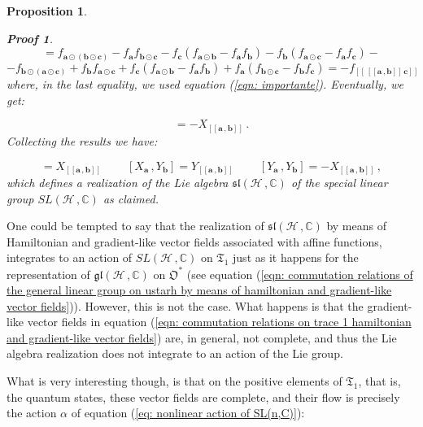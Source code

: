 \documentclass[11pt]{article}
\newcommand{\be}{\begin{equation}}
\newcommand{\ee}{\end{equation}}
\newcommand{\obsp}{\mathfrak{O}}
\newtheorem{prop}{Proposition}
\newtheorem*{pf}{Proof}
\begin{document}
\begin{prop}
\begin{pf}
$$
=f_{\mathbf{a}\odot(\mathbf{b}\odot\mathbf{c})} -  f_{\mathbf{a}}f_{\mathbf{b}\odot\mathbf{c}}  - 	 f_{\mathbf{c}} \left(f_{\mathbf{a}\odot\mathbf{b}}  -  f_{\mathbf{a}}f_{\mathbf{b}} \right) -  f_{\mathbf{b}} \left(f_{\mathbf{a}\odot\mathbf{c}}  -  f_{\mathbf{a}}f_{\mathbf{c}} \right) - 
$$
$$
-f_{\mathbf{b}\odot(\mathbf{a}\odot\mathbf{c})}  +  f_{\mathbf{b}}f_{\mathbf{a}\odot\mathbf{c}}  +  f_{\mathbf{c}} \left(f_{\mathbf{a}\odot\mathbf{b}}  -  f_{\mathbf{a}}f_{\mathbf{b}} \right) +  f_{\mathbf{a}} \left(f_{\mathbf{b}\odot\mathbf{c}}  -  f_{\mathbf{b}}f_{\mathbf{c}} \right)=-f_{\left[\left[\,[[\mathbf{a}\,,\mathbf{b}]]\,\mathbf{c}\right]\right]} 
$$
where, in the last equality, we used equation (\ref{eqn: importante}).
Eventually, we get:

\be
[Y_{\mathbf{a}}\,,Y_{\mathbf{b}}]=-X_{[[\mathbf{a}\,,\mathbf{b}]]}\,.
\ee
Collecting the results we have:

\be
[X_{\mathbf{a}}\,,X_{\mathbf{b}}]=X_{[[\mathbf{a}\,,\mathbf{b}]]}\;\;\;\;\;\;\;\;[X_{\mathbf{a}}\,,Y_{\mathbf{b}}]=Y_{[[\mathbf{a}\,,\mathbf{b}]]}\;\;\;\;\;\;\;\;[Y_{\mathbf{a}}\,,Y_{\mathbf{b}}]=-X_{[[\mathbf{a}\,,\mathbf{b}]]}\,,
\ee
which defines a realization of the Lie algebra $\mathfrak{sl}(\mathcal{H}\,,\mathbb{C})$ of the special linear group $SL(\mathcal{H}\,,\mathbb{C})$  as claimed.
\end{pf}
\end{prop}
One could be tempted to say that the realization of $\mathfrak{sl}(\mathcal{H}\,,\mathbb{C})$ by means of Hamiltonian and gradient-like vector fields associated with affine functions, integrates to an action of $SL(\mathcal{H}\,,\mathbb{C})$ on $\mathfrak{T}_{1}$ just as it happens for the representation of $\mathfrak{gl}(\mathcal{H}\,,\mathbb{C})$ on $\obsp^{*}$ (see equation (\ref{eqn: commutation relations of the general linear group on ustarh by means of hamiltonian and gradient-like vector fields})).
However, this is not the case.
What happens is that the gradient-like vector fields in equation (\ref{eqn: commutation relations on trace 1 hamiltonian and gradient-like vector fields}) are, in general, not complete, and thus the Lie algebra realization does not integrate to an action of the Lie group.

What is very interesting though, is that on the positive elements of $\mathfrak{T}_{1}$, that is, the quantum states, these vector fields are complete, and their flow is precisely the action $\alpha$ of equation (\ref{eq: nonlinear action of SL(n,C)}):
\end{document}
